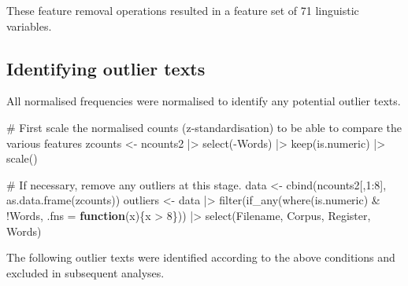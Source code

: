 \documentclass[
  letterpaper,
  DIV=11,
  numbers=noendperiod]{scrreprt}
\newenvironment{Shaded}{\begin{snugshade}}{\end{snugshade}}
\newcommand{\AttributeTok}[1]{\textcolor[rgb]{0.40,0.45,0.13}{#1}}
\newcommand{\CommentTok}[1]{\textcolor[rgb]{0.37,0.37,0.37}{#1}}
\newcommand{\ControlFlowTok}[1]{\textcolor[rgb]{0.00,0.23,0.31}{\textbf{#1}}}
\newcommand{\DecValTok}[1]{\textcolor[rgb]{0.68,0.00,0.00}{#1}}
\newcommand{\FunctionTok}[1]{\textcolor[rgb]{0.28,0.35,0.67}{#1}}
\newcommand{\NormalTok}[1]{\textcolor[rgb]{0.00,0.23,0.31}{#1}}
\newcommand{\OtherTok}[1]{\textcolor[rgb]{0.00,0.23,0.31}{#1}}
\newcommand{\SpecialCharTok}[1]{\textcolor[rgb]{0.37,0.37,0.37}{#1}}
\begin{document}
\begin{Shaded}
\end{Shaded}

These feature removal operations resulted in a feature set of 71
linguistic variables.

\subsection{Identifying outlier texts}\label{identifying-outlier-texts}

All normalised frequencies were normalised to identify any potential
outlier texts.

\begin{Shaded}
\begin{Highlighting}[]
\CommentTok{\# First scale the normalised counts (z{-}standardisation) to be able to compare the various features}
\NormalTok{zcounts }\OtherTok{\textless{}{-}}\NormalTok{ ncounts2 }\SpecialCharTok{|\textgreater{}}
  \FunctionTok{select}\NormalTok{(}\SpecialCharTok{{-}}\NormalTok{Words) }\SpecialCharTok{|\textgreater{}} 
  \FunctionTok{keep}\NormalTok{(is.numeric) }\SpecialCharTok{|\textgreater{}} 
  \FunctionTok{scale}\NormalTok{()}

\CommentTok{\# If necessary, remove any outliers at this stage.}
\NormalTok{data }\OtherTok{\textless{}{-}} \FunctionTok{cbind}\NormalTok{(ncounts2[,}\DecValTok{1}\SpecialCharTok{:}\DecValTok{8}\NormalTok{], }\FunctionTok{as.data.frame}\NormalTok{(zcounts))}
\NormalTok{outliers }\OtherTok{\textless{}{-}}\NormalTok{ data }\SpecialCharTok{|\textgreater{}} 
 \FunctionTok{filter}\NormalTok{(}\FunctionTok{if\_any}\NormalTok{(}\FunctionTok{where}\NormalTok{(is.numeric) }\SpecialCharTok{\&} \SpecialCharTok{!}\NormalTok{Words,  }\AttributeTok{.fns =} \ControlFlowTok{function}\NormalTok{(x)\{x }\SpecialCharTok{\textgreater{}} \DecValTok{8}\NormalTok{\}))  }\SpecialCharTok{|\textgreater{}}
  \FunctionTok{select}\NormalTok{(Filename, Corpus, Register, Words) }
\end{Highlighting}
\end{Shaded}

The following outlier texts were identified according to the above
conditions and excluded in subsequent analyses.
\end{document}
